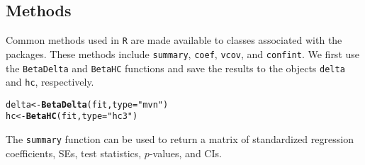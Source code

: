 \documentclass[man]{apa7}\usepackage[]{graphicx}\usepackage[]{xcolor}
\makeatletter
\newcommand{\hlstr}[1]{\textcolor[rgb]{0.192,0.494,0.8}{#1}}%
\newcommand{\hlstd}[1]{\textcolor[rgb]{0.345,0.345,0.345}{#1}}%
\newcommand{\hlkwb}[1]{\textcolor[rgb]{0.69,0.353,0.396}{#1}}%
\newcommand{\hlkwc}[1]{\textcolor[rgb]{0.333,0.667,0.333}{#1}}%
\newcommand{\hlkwd}[1]{\textcolor[rgb]{0.737,0.353,0.396}{\textbf{#1}}}%
\newenvironment{kframe}{%
 \def\at@end@of@kframe{}%
 \ifinner\ifhmode%
  \def\at@end@of@kframe{\end{minipage}}%
  \begin{minipage}{\columnwidth}%
 \fi\fi%
 \def\FrameCommand##1{\hskip\@totalleftmargin \hskip-\fboxsep
 \colorbox{shadecolor}{##1}\hskip-\fboxsep
     \hskip-\linewidth \hskip-\@totalleftmargin \hskip\columnwidth}%
 \MakeFramed {\advance\hsize-\width
   \@totalleftmargin\z@ \linewidth\hsize
   \@setminipage}}%
 {\par\unskip\endMakeFramed%
 \at@end@of@kframe}
\newenvironment{knitrout}{}{} %
\makeatother
\begin{document}
\subsection{Methods}

Common methods used in \texttt{R} are made available to classes associated with the packages. These methods include \texttt{summary}, \texttt{coef}, \texttt{vcov}, and \texttt{confint}. We first use the \texttt{BetaDelta} and \texttt{BetaHC} functions and save the results to the objects \texttt{delta} and \texttt{hc}, respectively.

\vspace{-.5em}
\begin{minipage}{.75\linewidth}
	\singlespacing
\begin{knitrout}\scriptsize
{}\color{fgcolor}\begin{kframe}
\begin{alltt}
\hlstd{delta} \hlkwb{<-} \hlkwd{BetaDelta}\hlstd{(fit,} \hlkwc{type} \hlstd{=} \hlstr{"mvn"}\hlstd{)}
\hlstd{hc} \hlkwb{<-} \hlkwd{BetaHC}\hlstd{(fit,} \hlkwc{type} \hlstd{=} \hlstr{"hc3"}\hlstd{)}
\end{alltt}
\end{kframe}
\end{knitrout}
\end{minipage}

\noindent The \texttt{summary} function can be used to return a matrix of standardized regression coefficients, SEs, test statistics, $p$-values, and CIs.
\end{document}
